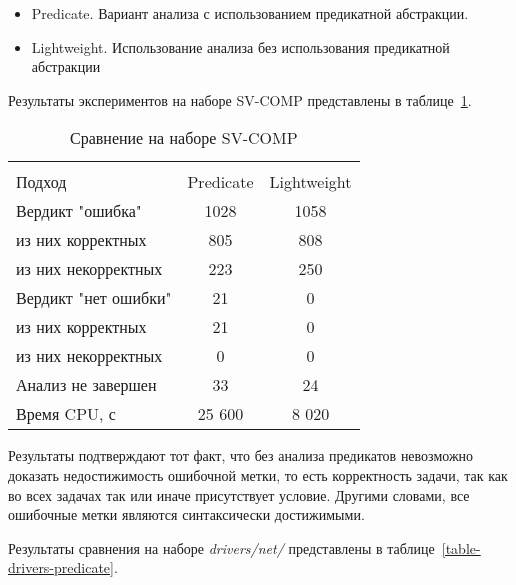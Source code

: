 \begin{itemize}
\item Predicate. Вариант анализа с использованием предикатной абстракции.
\item Lightweight. Использование анализа без использования предикатной абстракции
\end{itemize}

Результаты экспериментов на наборе SV-COMP представлены в таблице~\ref{table-svcomp-without-predicate}.

  \begin{table}[h]\footnotesize \centering
    \caption{Сравнение на наборе SV-COMP}
  	\label{table-svcomp-without-predicate}
    \begin{tabular}{ | l | c | c |}
      \hline
      		& 		\multicolumn{2}{c|}{\combatmode}  \\
      Подход         				&  Predicate	& Lightweight 		\\ \hline
      Вердикт "ошибка" 				& 1028   		& 1058   	\\ 
  \hspace{0.5cm} из них корректных 	& 805 			& 808 	 	\\ 
  \hspace{0.5cm} из них некорректных & 223 			& 250 	   	\\ \hline
      Вердикт "нет ошибки"  		& 21    		& 0     	\\ 
  \hspace{0.5cm} из них корректных 	& 21 			& 0    		\\
  \hspace{0.5cm} из них некорректных & 0 			& 0    	  	\\ \hline
      Анализ не завершен       		& 33    		& 24      	\\ \hline
      Время CPU, с   				& 25 600 		& 8 020  	\\ 
      \hline
    \end{tabular}
  \end{table}

Результаты подтверждают тот факт, что без анализа предикатов невозможно доказать недостижимость ошибочной метки, то есть корректность задачи, так как во всех задачах так или иначе присутствует условие.
Другими словами, все ошибочные метки являются синтаксически достижимыми.

Результаты сравнения на наборе \textit{drivers/net/} представлены в таблице~\ref{table-drivers-predicate}.

